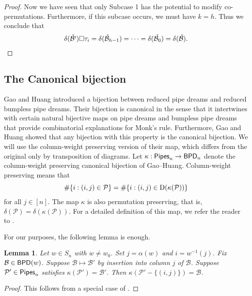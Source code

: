 \documentclass[12 pt]{amsart}
\newcommand{\addable}{\alpha}
\newtheorem{lemma}[Theorem]{Lemma}
\numberwithin{equation}{section}
\theoremstyle{remark}
\newcommand{\pipes}{{\sf Pipes}}
\newcommand{\bpd}{{\sf BPD}}
\newcommand{\demprod}{\delta}
\newcommand{\rothe}{{\rm D}}
\begin{document}
\begin{proof}
			Now we have seen that only Subcase 1 has the potential to modify co-permutations. 
			Furthermore, if this subcase occurs, we must have $k=h$. 
			Thus we conclude that \[\demprod(\check{\mathcal{B}'})\square \tau_i = \demprod(\check{\mathcal{B}}_{h-1}) = \cdots = \demprod(\check{\mathcal{B}_0})=\demprod(\check{\mathcal{B}}). \qedhere\]
		\end{proof}
		
		
		
		\subsection{The Canonical bijection}
		
		
		Gao and Huang \cite{Gao.Huang} introduced a bijection between reduced pipe dreams and reduced bumpless pipe dreams. 
		Their bijection is canonical in the sense that it intertwines with certain natural bijective maps on pipe dreams and bumpless pipe dreams that provide combinatorial explanations for Monk's rule.  Furthermore, Gao and Huang showed that any bijection with this property is the canonical bijection.
		We will use the column-weight preserving version of their map, which differs from the original only by transposition of diagrams. 
		Let $\kappa:\pipes_n\rightarrow \bpd_n$ denote the column-weight preserving canonical bijection of Gao--Huang. Column-weight preserving means that
		\[\#\{i:(i,j) \in \mathcal{P}\} = \#\{i:(i,j) \in \rothe(\kappa(\mathcal{P}))\}\] for all $j \in [n]$.
		The map $\kappa$ is also permutation preserving, that is, $\delta(\mathcal{P}) = \delta(\kappa(\mathcal{P}))$.
		For a detailed definition of this map, we refer the reader to \cite{Gao.Huang}.
		

		For our purposes, the following lemma is enough.
		
		\begin{lemma}
			\label{lemma:monkcompatible}
			Let $w \in S_n$ with $w \neq w_0$. Set $j = \addable(w)$ and $i=w^{-1}(j)$. 
			Fix $\mathcal{B} \in \bpd(w)$. 
			Suppose $\mathcal{B} \mapsto \mathcal{B}'$ by insertion into column $j$ of $\mathcal{B}$. 
			Suppose $\mathcal{P}' \in \pipes_n$ satisfies $\kappa(\mathcal{P}') = \mathcal{B}'$. Then $\kappa({\mathcal{P}'}-\{(i,j)\}) = \mathcal{B}$.
		\end{lemma}
		\begin{proof}
			This follows from a special case of \cite[Theorem 4.5]{Gao.Huang}.
		\end{proof}
				
\end{document}
